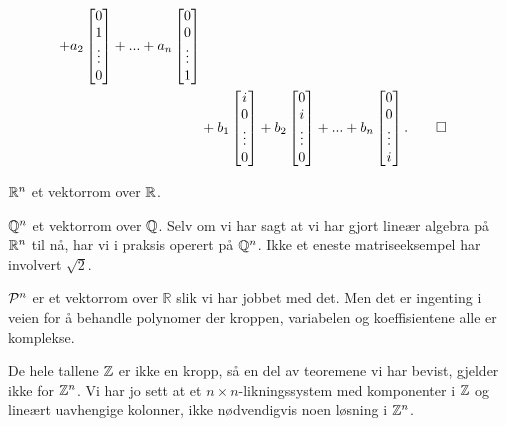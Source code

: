 \begin{ex}
\begin{align*}
+
a_2
\begin{bmatrix}
0    \\ 1  \\ \vdots \\ 0
\end{bmatrix}
+...+
a_n
\begin{bmatrix}
0    \\ 0  \\ \vdots \\ 1
\end{bmatrix}
\\ &+
b_1
\begin{bmatrix}
i    \\ 0  \\ \vdots \\ 0
\end{bmatrix}
+
b_2
\begin{bmatrix}
0    \\ i  \\ \vdots \\ 0
\end{bmatrix}
+...+
b_n
\begin{bmatrix}
0    \\ 0  \\ \vdots \\ i
\end{bmatrix}. \qedhere
\end{align*}
\end{ex}

\begin{ex}
$\R^n$ et vektorrom over $\R$.
\end{ex}

\begin{ex}
$\Q^n$ et vektorrom over $\Q$. Selv om vi har sagt at vi har gjort lineær algebra på $\R^n$ til nå, har vi i praksis operert på $\Q^n$. Ikke et eneste matriseeksempel har involvert $\sqrt{2}$.
\end{ex}

\begin{ex}
$\P^n$ er et vektorrom over $\mathbb R$ slik vi har jobbet med det. 
Men det er ingenting i veien for å behandle polynomer der kroppen, variabelen og koeffisientene alle er komplekse.
\end{ex}


\begin{ex}
De hele tallene $\Z$ er ikke en kropp, så en del av teoremene vi har bevist, gjelder ikke for $\Z^n$. 
Vi har jo sett at et $n\times n$-likningssystem med komponenter i $\Z$ og lineært uavhengige kolonner,  
ikke nødvendigvis noen løsning i $\Z^n$. 
\end{ex}



